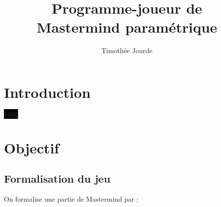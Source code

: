 \documentclass[a4paper]{article}
\title{Programme-joueur de \\ Mastermind paramétrique}
\author{Timothée Jourde}
\renewcommand{\(}{\begin{math}\color{brick}}
\renewcommand{\)}{\end{math}}
\newcommand{\TODO}{\colorbox{black}{\textbf{\texttt{\large\color{white}TODO}}}}
\begin{document}

\maketitle


{\color{brick}\tableofcontents}

\section{Introduction}

\TODO

\section{Objectif}

\subsection{Formalisation du jeu}

On formalise une partie de Mastermind par :
\end{document}
